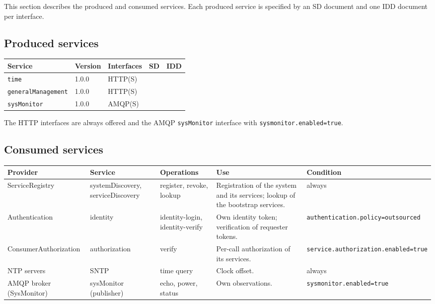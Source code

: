 \documentclass[a4paper]{arrowhead}
\begin{document}
This section describes the produced and consumed services. Each produced service is specified by an SD document and one IDD document per interface.

\subsection{Produced services}

\noindent\begin{longtable}{| p{5.3cm} | p{1.3cm} | p{2.6cm} | p{1.6cm} | p{3.6cm} |} \hline
\rowcolor{gray!33} Service & Version & Interfaces & SD & IDD \\ \hline \endhead
\texttt{time} & 1.0.0 & HTTP(S) & \cite{tim-time-sd} & \cite{tim-time-http-idd} \\ \hline
\texttt{generalManagement} & 1.0.0 & HTTP(S) & \cite{tim-generalManagement-sd} & \cite{tim-generalManagement-http-idd} \\ \hline
\texttt{sysMonitor} & 1.0.0 & AMQP(S) & \cite{tim-sysMonitor-sd} & \cite{tim-sysMonitor-amqp-idd} \\ \hline
\end{longtable}

The HTTP interfaces are always offered and the AMQP \texttt{sysMonitor} interface with \texttt{sysmonitor.enabled=true}.

\subsection{Consumed services}

\noindent\begin{longtable}{| >{\raggedright\arraybackslash}p{2.9cm} | >{\raggedright\arraybackslash}p{3.1cm} | >{\raggedright\arraybackslash}p{2.5cm} | p{3.6cm} | >{\raggedright\arraybackslash}p{2.9cm} |} \hline
\rowcolor{gray!33} Provider & Service & Operations & Use & Condition \\ \hline \endhead
ServiceRegistry & systemDiscovery, serviceDiscovery & register, revoke, lookup & Registration of the system and its services; lookup of the bootstrap services. & always \\ \hline
Authentication & identity & identity-login, identity-verify & Own identity token; verification of requester tokens. & \texttt{authentication.\allowbreak{}policy=\allowbreak{}outsourced} \\ \hline
Consumer\allowbreak{}Authorization & authorization & verify & Per-call authorization of its services. & \texttt{service.\allowbreak{}authorization.\allowbreak{}enabled=\allowbreak{}true} \\ \hline
NTP servers & SNTP & time query & Clock offset. & always \\ \hline
AMQP broker (SysMonitor) & sysMonitor (publisher) & echo, power, status & Own observations. & \texttt{sysmonitor.\allowbreak{}enabled=\allowbreak{}true} \\ \hline
\end{longtable}
\end{document}
